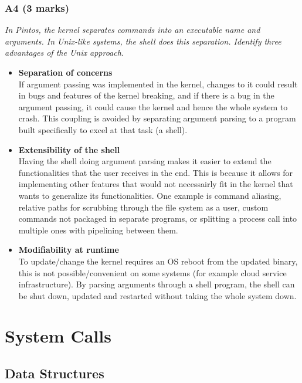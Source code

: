 \documentclass{report}
\newcommand{\question}[1]{\textit{#1} \ }
\newcommand{\bullpara}[2]{\item \textbf{#1} \ #2}
\begin{document}
            \subsubsection*{A4 (3 marks)}
                \question{In Pintos, the kernel separates commands into an executable name and arguments. In Unix-like systems, the shell 
                does this separation. Identify three advantages of the Unix approach.}
                \begin{itemize}
                    \bullpara{Separation of concerns}{\\ If argument passing was implemented in the kernel, changes to it could result in bugs and features of the kernel breaking, and 
                    if there is a bug in the argument passing, it could cause the kernel and hence the whole system to crash. This coupling is avoided by separating argument parsing to a program built specifically to excel at that task (a shell).}
                    \bullpara{Extensibility of the shell}{\\ Having the shell doing argument parsing makes it easier to extend the functionalities that the user receives in the end.
                    This is because it allows for implementing other features that would not necessairly fit in the kernel that wants to generalize its functionalities.
                    One example is command aliasing, relative paths for scrubbing through the file system as a user, custom commands not packaged in separate programs,
                    or splitting a process call into multiple ones with pipelining between them.}
                    \bullpara{Modifiability at runtime} {\\ To update/change the kernel requires an OS reboot from the updated binary, this is not possible/convenient on some systems (for example cloud service infrastructure).
                    By parsing arguments through a shell program, the shell can be shut down, updated and restarted without taking the whole system down.}
                \end{itemize}
            
    \section*{System Calls}
        \subsection*{Data Structures}
\end{document}
